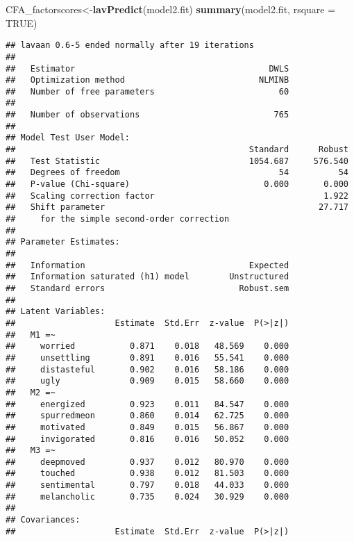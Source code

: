 \documentclass[
]{article}
\newenvironment{Shaded}{\begin{snugshade}}{\end{snugshade}}
\newcommand{\DataTypeTok}[1]{\textcolor[rgb]{0.13,0.29,0.53}{#1}}
\newcommand{\KeywordTok}[1]{\textcolor[rgb]{0.13,0.29,0.53}{\textbf{#1}}}
\newcommand{\NormalTok}[1]{#1}
\newcommand{\OtherTok}[1]{\textcolor[rgb]{0.56,0.35,0.01}{#1}}
\begin{document}
\begin{Shaded}
\begin{Highlighting}[]
\NormalTok{CFA\_factorscores\textless{}{-}}\KeywordTok{lavPredict}\NormalTok{(model2.fit)}
\KeywordTok{summary}\NormalTok{(model2.fit, }\DataTypeTok{rsquare =} \OtherTok{TRUE}\NormalTok{)}
\end{Highlighting}
\end{Shaded}

\begin{verbatim}
## lavaan 0.6-5 ended normally after 19 iterations
## 
##   Estimator                                       DWLS
##   Optimization method                           NLMINB
##   Number of free parameters                         60
##                                                       
##   Number of observations                           765
##                                                       
## Model Test User Model:
##                                               Standard      Robust
##   Test Statistic                              1054.687     576.540
##   Degrees of freedom                                54          54
##   P-value (Chi-square)                           0.000       0.000
##   Scaling correction factor                                  1.922
##   Shift parameter                                           27.717
##     for the simple second-order correction 
## 
## Parameter Estimates:
## 
##   Information                                 Expected
##   Information saturated (h1) model        Unstructured
##   Standard errors                           Robust.sem
## 
## Latent Variables:
##                    Estimate  Std.Err  z-value  P(>|z|)
##   M1 =~                                               
##     worried           0.871    0.018   48.569    0.000
##     unsettling        0.891    0.016   55.541    0.000
##     distasteful       0.902    0.016   58.186    0.000
##     ugly              0.909    0.015   58.660    0.000
##   M2 =~                                               
##     energized         0.923    0.011   84.547    0.000
##     spurredmeon       0.860    0.014   62.725    0.000
##     motivated         0.849    0.015   56.867    0.000
##     invigorated       0.816    0.016   50.052    0.000
##   M3 =~                                               
##     deepmoved         0.937    0.012   80.970    0.000
##     touched           0.938    0.012   81.503    0.000
##     sentimental       0.797    0.018   44.033    0.000
##     melancholic       0.735    0.024   30.929    0.000
## 
## Covariances:
##                    Estimate  Std.Err  z-value  P(>|z|)

\end{verbatim}
\end{document}
